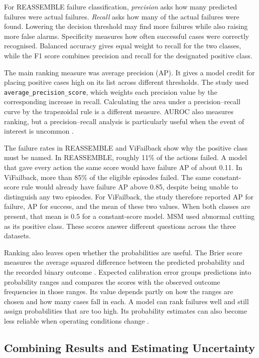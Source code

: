 For REASSEMBLE failure classification, \emph{precision} asks how many predicted failures
were actual failures. \emph{Recall} asks how many of the actual failures were found.
Lowering the decision threshold may find more failures while also raising more false
alarms. Specificity measures how often successful cases were correctly recognised.
Balanced accuracy gives equal weight to recall for the two classes, while the F1 score
combines precision and recall for the designated positive class.

The main ranking measure was average precision (AP). It gives a model credit
for placing positive cases high on its list across different thresholds. The study used
\texttt{average\_precision\_score}, which weights each precision value by the
corresponding increase in recall. Calculating the area under a precision--recall curve by
the trapezoidal rule is a different measure. AUROC also measures ranking, but a
precision--recall analysis is particularly useful when the event of interest is uncommon
\parencite{Saito2015PrecisionRecall}.

The failure rates in REASSEMBLE and ViFailback show why the positive class must be
named. In REASSEMBLE, roughly 11\% of the actions failed. A model that gave every action
the same score would have failure AP of about 0.11. In ViFailback, more than 85\% of the
eligible episodes failed. The same constant-score rule would already have failure AP
above 0.85, despite being unable to distinguish any two episodes. For ViFailback, the
study therefore reported AP for failure, AP for success, and the mean of these two
values. When both classes are present, that mean is 0.5 for a constant-score model. MSM
used abnormal cutting as its positive class. These scores answer different questions
across the three datasets.

Ranking also leaves open whether the probabilities are useful. The Brier score
measures the average squared difference between the predicted probability and the
recorded binary outcome \parencite{P055}. Expected calibration error groups
predictions into probability ranges and compares the scores with the observed outcome
frequencies in those ranges. Its value depends partly on how the ranges are chosen and
how many cases fall in each. A model can rank failures well and still assign
probabilities that are too high. Its probability estimates can also become less reliable
when operating conditions change \parencite{P008}.

\subsection{Combining Results and Estimating Uncertainty}

